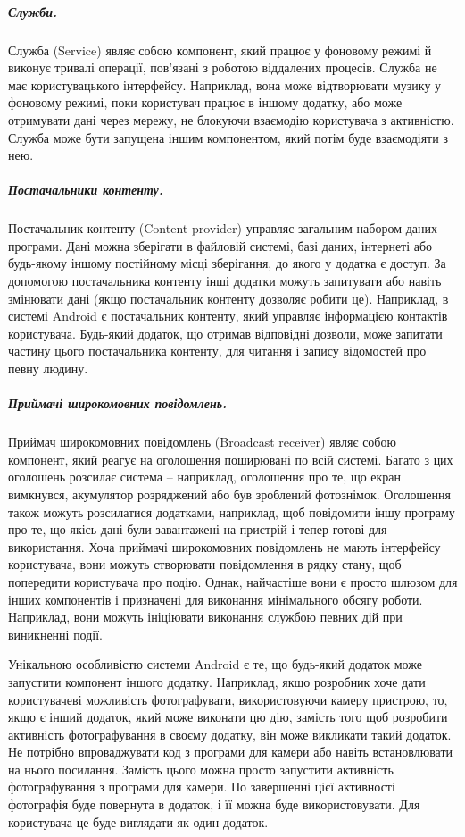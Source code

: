 \documentclass[../main.tex]{subfiles}
\begin{document}
\subparagraph{Служби.}
Служба (Service) являє собою компонент, який працює у фоновому режимі й виконує тривалі операції, пов'язані з роботою віддалених процесів. Служба не має користувацького інтерфейсу. Наприклад, вона може відтворювати музику у фоновому режимі, поки користувач працює в іншому додатку, або може отримувати дані через мережу, не блокуючи взаємодію користувача з активністю. Служба може бути запущена іншим компонентом, який потім буде взаємодіяти з нею.

\subparagraph{Постачальники контенту.}
Постачальник контенту (Content provider) управляє загальним набором даних програми. Дані можна зберігати в файловій системі, базі даних, інтернеті або будь-якому іншому постійному місці зберігання, до якого у додатка є доступ. За допомогою постачальника контенту інші додатки можуть запитувати або навіть змінювати дані (якщо постачальник контенту дозволяє робити це). Наприклад, в системі Android є постачальник контенту, який управляє інформацією контактів користувача. Будь-який додаток, що отримав відповідні дозволи, може запитати частину цього постачальника контенту, для читання і запису відомостей про певну людину.

\subparagraph{Приймачі широкомовних повідомлень.}
Приймач широкомовних повідомлень (Broadcast receiver) являє собою компонент, який реагує на оголошення поширювані по всій системі. Багато з цих оголошень розсилає система -- наприклад, оголошення про те, що екран вимкнувся, акумулятор розряджений або був зроблений фотознімок. Оголошення також можуть розсилатися додатками, наприклад, щоб повідомити іншу програму про те, що якісь дані були завантажені на пристрій і тепер готові для використання. Хоча приймачі широкомовних повідомлень не мають інтерфейсу користувача, вони можуть створювати повідомлення в рядку стану, щоб попередити користувача про подію. Однак, найчастіше вони є просто шлюзом для інших компонентів і призначені для виконання мінімального обсягу роботи. Наприклад, вони можуть ініціювати виконання службою певних дій при виникненні події.

Унікальною особливістю системи Android є те, що будь-який додаток може запустити компонент іншого додатку. Наприклад, якщо розробник хоче дати користувачеві можливість фотографувати, використовуючи камеру пристрою, то, якщо є інший додаток, який може виконати цю дію, замість того щоб розробити активність фотографування в своєму додатку, він може викликати такий додаток. Не потрібно впроваджувати код з програми для камери або навіть встановлювати на нього посилання. Замість цього можна просто запустити активність фотографування з програми для камери. По завершенні цієї активності фотографія буде повернута в додаток, і її можна буде використовувати. Для користувача це буде виглядати як один додаток.
\end{document}
